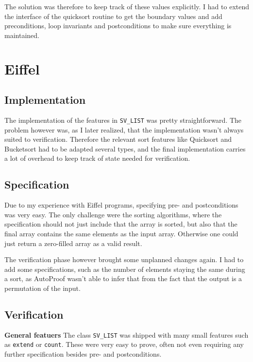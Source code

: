 \documentclass[a4paper,10pt]{article}
\begin{document}
The solution was therefore to keep track of these values explicitly.
I had to extend the interface of the quicksort routine to get the boundary values and add preconditions, 
loop invariants and postconditions to make sure everything is maintained.


\section{Eiffel}

\subsection{Implementation}

The implementation of the features in \lstinline!SV_LIST! was pretty straightforward.
The problem however was, as I later realized, that the implementation wasn't always suited to verification.
Therefore the relevant sort features like Quicksort and Bucketsort had to be adapted several types, 
and the final implementation carries a lot of overhead to keep track of state needed for verification.

\subsection{Specification}

Due to my experience with Eiffel programs, specifying pre- and postconditions was very easy.
The only challenge were the sorting algorithms, where the specification should not just include that the array is sorted,
but also that the final array contains the same elements as the input array.
Otherwise one could just return a zero-filled array as a valid result.

The verification phase however brought some unplanned changes again.
I had to add some specifications, such as the number of elements staying the same during a sort, 
as AutoProof wasn't able to infer that from the fact that the output is a permutation of the input.

\subsection{Verification}

\textbf{General featuers}
The class \lstinline!SV_LIST! was shipped with many small features such as \lstinline!extend! or \lstinline!count!.
These were very easy to prove, often not even requiring any further specification besides pre- and postconditions.
\end{document}
